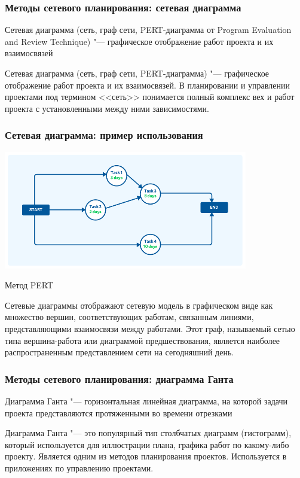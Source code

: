 \documentclass{../industrial-development}
\begin{document}
    \begin{frame} \frametitle{Методы сетевого планирования: сетевая диаграмма}
        \begin{definition}
            \alert{Сетевая диаграмма} (сеть, граф сети, PERT-диаграмма от Program Evaluation and Review Technique) "--- графическое отображение работ проекта и их взаимосвязей
        \end{definition}
    \end{frame}
    \lecturenotes 

Сетевая диаграмма (сеть, граф сети, PERT-диаграмма) "--- графическое отображение работ проекта и их взаимосвязей. В планировании и управлении проектами под термином <<сеть>> понимается полный комплекс вех и работ проекта с установленными между ними зависимостями.

    \begin{frame} \frametitle{Сетевая диаграмма: пример использования}
         \centerline{\includegraphics[width=0.8\textwidth]{pert.png}}
	\centerline{Метод PERT}
    \end{frame}
    \lecturenotes

Сетевые диаграммы отображают сетевую модель в графическом виде как множество вершин, соответствующих работам, связанным линиями, представляющими взаимосвязи между работами. Этот граф, называемый сетью типа вершина-работа или диаграммой предшествования, является наиболее распространенным представлением сети на сегодняшний день.

    \begin{frame} \frametitle{Методы сетевого планирования: диаграмма Ганта}
        \begin{definition}
            \alert{Диаграмма Ганта} "--- горизонтальная линейная диаграмма, на которой задачи проекта представляются протяженными во времени отрезками
        \end{definition}
    \end{frame}
    \lecturenotes 

Диаграмма Ганта "--- это популярный тип столбчатых диаграмм (гистограмм), который используется для иллюстрации плана, графика работ по какому-либо проекту. Является одним из методов планирования проектов. Используется в приложениях по управлению проектами.
\end{document}
